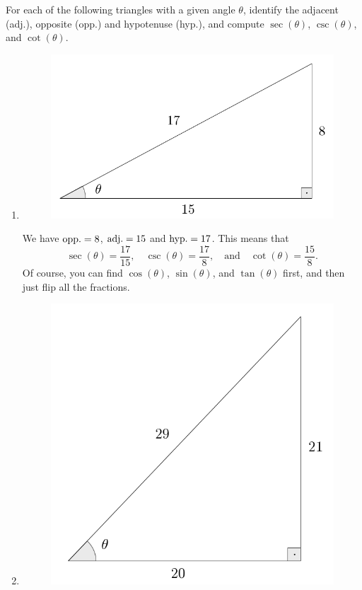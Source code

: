 \documentclass{ximera}
\begin{document}
\begin{example}
  For each of the following triangles with a given angle $\theta$, identify the adjacent (adj.), opposite (opp.) and hypotenuse (hyp.), and compute $\sec(\theta)$, $\csc(\theta)$, and $\cot(\theta)$.
  \begin{enumerate}[label=\alph*.]
  \item  \begin{figure}[h]
      \centering
      \includegraphics[scale=.3]{./figures/9-1-2-triangle-15-8-17.png}
    \end{figure}
    \begin{explanation}
      We have ${\rm opp.} = 8$, ${\rm adj.} = 15$ and ${\rm hyp.} = 17$. This means that $$\sec(\theta) = \frac{17}{15}, \quad \csc(\theta) =\frac{17}{8}, \quad\mbox{and}\quad \cot(\theta) =\frac{15}{8}. $$Of course, you can find $\cos(\theta)$, $\sin(\theta)$, and $\tan(\theta)$ first, and then just flip all the fractions.
    \end{explanation}
  \item \begin{figure}[h]
      \centering
      \includegraphics[scale=.3]{./figures/9-1-2-triangle-20-21-29.png}

\end{figure}
\end{enumerate}
\end{example}
\end{document}
